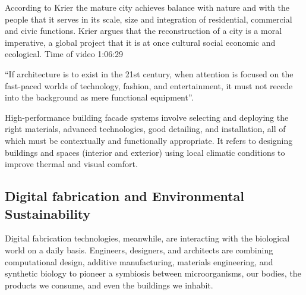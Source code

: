     According to Krier the mature city achieves balance with nature and with the people that it serves in its scale, size and integration of residential, commercial and civic functions.
    Krier argues that the reconstruction of a city is a moral imperative, a global project that it is at once cultural social economic and ecological. Time of video 1:06:29\cite{Economakis2023}


        ``If architecture is to exist in the 21st century, when attention is focused on the fast-paced worlds of technology, fashion, and entertainment, it must not recede into the background as mere functional equipment''\cite{Gage2015}.

        High-performance building facade systems involve selecting and deploying the right materials, advanced technologies, good detailing, and installation, all of which must be contextually and functionally appropriate.
        It refers to designing buildings and spaces (interior and exterior) using local climatic conditions to improve thermal and visual comfort.\cite{Kamaltech2020}



\subsection{Digital fabrication and Environmental Sustainability}
\label{subsec:DigitalFabricationAndEnvSustainability}
Digital fabrication technologies, meanwhile, are interacting with the biological world on a daily basis.
Engineers, designers, and architects are combining computational design, additive manufacturing, materials engineering, and synthetic biology to pioneer a symbiosis between microorganisms, our bodies, the products we consume, and even the buildings we inhabit\cite{Schwab2016}.



